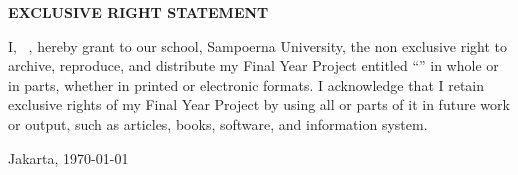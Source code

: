 \begin{center}
	\fontsize{14bp}{1.5\baselineskip}\selectfont
	\textbf{EXCLUSIVE RIGHT STATEMENT}
\end{center}
\begin{justify}
	\begin{doublespace}
		I, \AUTHOR \ \STUDENTID, hereby grant to our school, Sampoerna University, the non exclusive right to archive, reproduce, and distribute my Final Year Project entitled “\TITLE” in whole or in parts, whether in printed or electronic formats. I acknowledge that I retain exclusive rights of my Final Year Project by using all or parts of it in future work or output, such as articles, books, software, and information system.	
	\end{doublespace}
	\fontsize{12bp}{1.5\baselineskip}\selectfont

	\noindent Jakarta, \today
	
	
	\noindent \AUTHOR
\end{justify}
\pagebreak